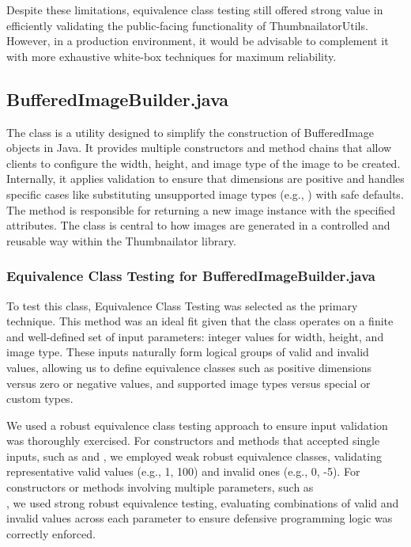 \documentclass[12pt]{article}
\begin{document}
    Despite these limitations, equivalence class testing still offered strong
        value in efficiently validating the public-facing functionality of ThumbnailatorUtils. However, in a production environment, it would be advisable to complement it with more exhaustive white-box techniques for maximum reliability.

    \markboth{}{}
    \fancyhead{}
    \subsection{BufferedImageBuilder.java}
    \markboth{}{}

    The  class is a utility designed to simplify the
        construction of BufferedImage objects in Java.
    It provides multiple constructors and method chains that allow clients to
        configure the width, height, and image type of the image to be created.
    Internally, it applies validation to ensure that dimensions are positive and
        handles specific cases like substituting unsupported image types (e.g.,
        ) with safe defaults.
    The  method is responsible for returning a new image instance
        with the specified attributes.
    The class is central to how images are generated in a controlled and
        reusable way within the Thumbnailator library.

    \markboth{}{}
    \subsubsection{Equivalence Class Testing for BufferedImageBuilder.java}
    \markboth{}{}

    To test this class, Equivalence Class Testing was selected as the primary
        technique.
    This method was an ideal fit given that the class operates on a finite and
        well-defined set of input parameters: integer values for width, height,
        and image type.
    These inputs naturally form logical groups of valid and invalid values,
        allowing us to define equivalence classes such as positive dimensions
        versus zero or negative values, and supported image types versus special
        or custom types.

    We used a robust equivalence class testing approach to ensure input
        validation was thoroughly exercised.
    For constructors and methods that accepted single inputs, such as
         and , we employed weak robust
        equivalence classes, validating representative valid values
        (e.g., 1, 100) and invalid ones (e.g., 0, -5).
    For constructors or methods involving multiple parameters, such as\\
        , we used strong robust
        equivalence testing, evaluating combinations of valid and invalid
        values across each parameter to ensure defensive programming logic was
        correctly enforced.
\end{document}
